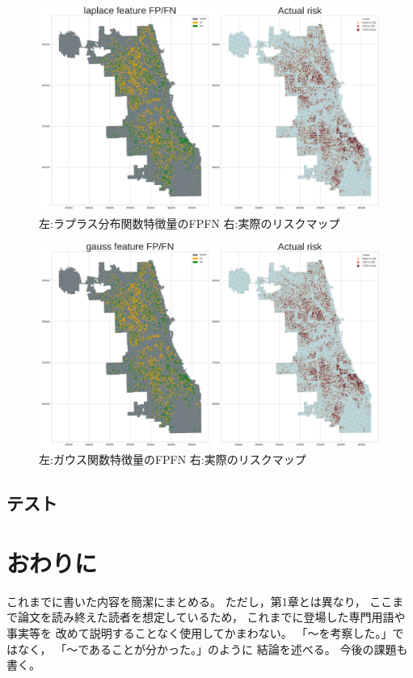 \documentclass[12pt,a4paper,oneside]{jsbook}
\theoremstyle{plain}
\begin{document}
\begin{figure}
  \centering %
  \includegraphics[scale=0.25]{./non-crime-val-figure/laplace_fnp.png}
  \caption{左:ラプラス分布関数特徴量のFPFN 右:実際のリスクマップ}
  \label{fig:nc-val-laplace-fnp}
\end{figure}

\begin{figure}
  \centering %
  \includegraphics[scale=0.25]{./non-crime-val-figure/gauss_fnp.png}
  \caption{左:ガウス関数特徴量のFPFN 右:実際のリスクマップ}
  \label{fig:nc-val-gauss-fnp}
\end{figure}
\section{テスト}
\chapter{おわりに}
これまでに書いた内容を簡潔にまとめる。
ただし，第1章とは異なり，
ここまで論文を読み終えた読者を想定しているため，
これまでに登場した専門用語や事実等を
改めて説明することなく使用してかまわない。
「～を考察した。」ではなく，
「～であることが分かった。」のように
結論を述べる。
今後の課題も書く。
\end{document}

